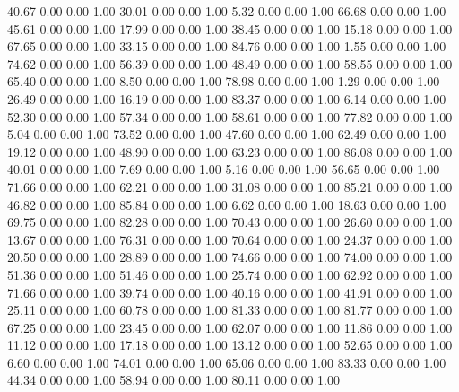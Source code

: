    40.67   0.00   0.00   1.00
   30.01   0.00   0.00   1.00
    5.32   0.00   0.00   1.00
   66.68   0.00   0.00   1.00
   45.61   0.00   0.00   1.00
   17.99   0.00   0.00   1.00
   38.45   0.00   0.00   1.00
   15.18   0.00   0.00   1.00
   67.65   0.00   0.00   1.00
   33.15   0.00   0.00   1.00
   84.76   0.00   0.00   1.00
    1.55   0.00   0.00   1.00
   74.62   0.00   0.00   1.00
   56.39   0.00   0.00   1.00
   48.49   0.00   0.00   1.00
   58.55   0.00   0.00   1.00
   65.40   0.00   0.00   1.00
    8.50   0.00   0.00   1.00
   78.98   0.00   0.00   1.00
    1.29   0.00   0.00   1.00
   26.49   0.00   0.00   1.00
   16.19   0.00   0.00   1.00
   83.37   0.00   0.00   1.00
    6.14   0.00   0.00   1.00
   52.30   0.00   0.00   1.00
   57.34   0.00   0.00   1.00
   58.61   0.00   0.00   1.00
   77.82   0.00   0.00   1.00
    5.04   0.00   0.00   1.00
   73.52   0.00   0.00   1.00
   47.60   0.00   0.00   1.00
   62.49   0.00   0.00   1.00
   19.12   0.00   0.00   1.00
   48.90   0.00   0.00   1.00
   63.23   0.00   0.00   1.00
   86.08   0.00   0.00   1.00
   40.01   0.00   0.00   1.00
    7.69   0.00   0.00   1.00
    5.16   0.00   0.00   1.00
   56.65   0.00   0.00   1.00
   71.66   0.00   0.00   1.00
   62.21   0.00   0.00   1.00
   31.08   0.00   0.00   1.00
   85.21   0.00   0.00   1.00
   46.82   0.00   0.00   1.00
   85.84   0.00   0.00   1.00
    6.62   0.00   0.00   1.00
   18.63   0.00   0.00   1.00
   69.75   0.00   0.00   1.00
   82.28   0.00   0.00   1.00
   70.43   0.00   0.00   1.00
   26.60   0.00   0.00   1.00
   13.67   0.00   0.00   1.00
   76.31   0.00   0.00   1.00
   70.64   0.00   0.00   1.00
   24.37   0.00   0.00   1.00
   20.50   0.00   0.00   1.00
   28.89   0.00   0.00   1.00
   74.66   0.00   0.00   1.00
   74.00   0.00   0.00   1.00
   51.36   0.00   0.00   1.00
   51.46   0.00   0.00   1.00
   25.74   0.00   0.00   1.00
   62.92   0.00   0.00   1.00
   71.66   0.00   0.00   1.00
   39.74   0.00   0.00   1.00
   40.16   0.00   0.00   1.00
   41.91   0.00   0.00   1.00
   25.11   0.00   0.00   1.00
   60.78   0.00   0.00   1.00
   81.33   0.00   0.00   1.00
   81.77   0.00   0.00   1.00
   67.25   0.00   0.00   1.00
   23.45   0.00   0.00   1.00
   62.07   0.00   0.00   1.00
   11.86   0.00   0.00   1.00
   11.12   0.00   0.00   1.00
   17.18   0.00   0.00   1.00
   13.12   0.00   0.00   1.00
   52.65   0.00   0.00   1.00
    6.60   0.00   0.00   1.00
   74.01   0.00   0.00   1.00
   65.06   0.00   0.00   1.00
   83.33   0.00   0.00   1.00
   44.34   0.00   0.00   1.00
   58.94   0.00   0.00   1.00
   80.11   0.00   0.00   1.00
